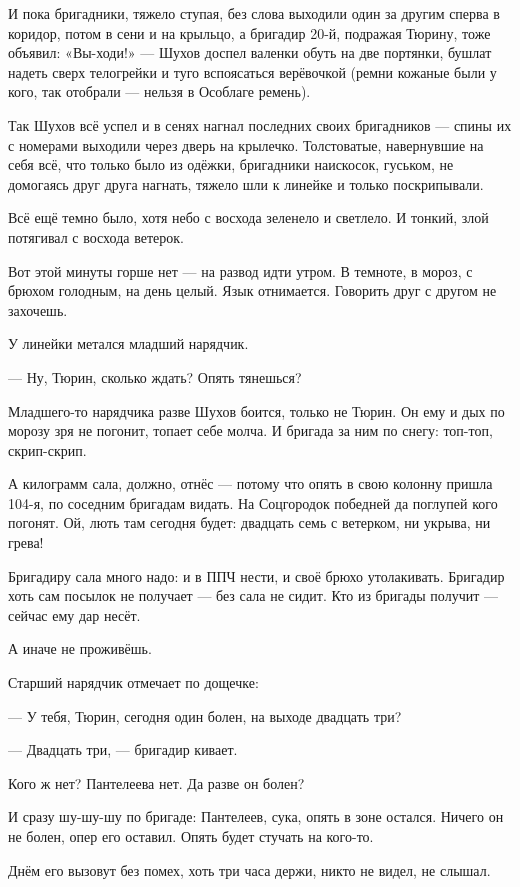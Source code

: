И пока бригадники, тяжело ступая, без слова выходили один за другим сперва в коридор, потом в
сени и на крыльцо, а бригадир 20-й, подражая Тюрину, тоже объявил: «Вы-ходи!» --- Шухов доспел
валенки обуть на две портянки, бушлат надеть сверх телогрейки и туго вспоясаться верёвочкой
(ремни кожаные были у кого, так отобрали --- нельзя в Особлаге ремень).

Так Шухов всё успел и в сенях нагнал последних своих бригадников --- спины их с номерами
выходили через дверь на крылечко. Толстоватые, навернувшие на себя всё, что только было из
одёжки, бригадники наискосок, гуськом, не домогаясь друг друга нагнать, тяжело шли к линейке
и только поскрипывали.

Всё ещё темно было, хотя небо с восхода зеленело и светлело. И тонкий, злой потягивал с
восхода ветерок.

Вот этой минуты горше нет --- на развод идти утром. В темноте, в мороз, с брюхом голодным, на
день целый. Язык отнимается. Говорить друг с другом не захочешь.

У линейки метался младший нарядчик.

--- Ну, Тюрин, сколько ждать? Опять тянешься?

Младшего-то нарядчика разве Шухов боится, только не Тюрин. Он ему и дых по морозу зря не
погонит, топает себе молча. И бригада за ним по снегу: топ-топ, скрип-скрип.

А килограмм сала, должно, отнёс --- потому что опять в свою колонну пришла 104-я, по соседним
бригадам видать. На Соцгородок победней да поглупей кого погонят. Ой, лють там сегодня будет:
двадцать семь с ветерком, ни укрыва, ни грева!

Бригадиру сала много надо: и в ППЧ нести, и своё брюхо утолакивать. Бригадир хоть сам посылок
не получает --- без сала не сидит. Кто из бригады получит --- сейчас ему дар несёт.

А иначе не проживёшь.

Старший нарядчик отмечает по дощечке:

--- У тебя, Тюрин, сегодня один болен, на выходе двадцать три?

--- Двадцать три, --- бригадир кивает.

Кого ж нет? Пантелеева нет. Да разве он болен?

И сразу шу-шу-шу по бригаде: Пантелеев, сука, опять в зоне остался. Ничего он не болен, опер его
оставил. Опять будет стучать на кого-то.

Днём его вызовут без помех, хоть три часа держи, никто не видел, не слышал.

